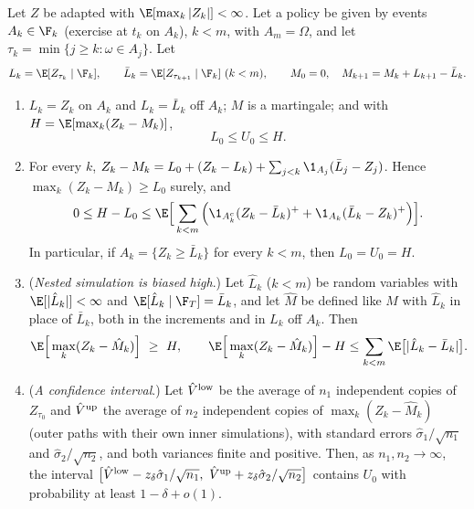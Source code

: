 \begin{proposition}\label{prop:am-andersen-broadie}
Let $Z$ be adapted with $\E[\max_k|Z_k|]<\infty$. Let a policy be given by events
$A_k\in\F_k$ (exercise at $t_k$ on $A_k$), $k<m$, with $A_m=\Omega$, and let
$\tau_k=\min\{j\ge k:\omega\in A_j\}$. Let
\[
  L_k=\E[Z_{\tau_k}\mid\F_k],\qquad\bar L_k=\E[Z_{\tau_{k+1}}\mid\F_k]\ (k<m),\qquad
  M_0=0,\quad M_{k+1}=M_k+L_{k+1}-\bar L_k .
\]
\begin{enumerate}[label=(\roman*)]
  \item $L_k=Z_k$ on $A_k$ and $L_k=\bar L_k$ off $A_k$; $M$ is a martingale; and with
    $H=\E[\max_k(Z_k-M_k)]$,
    \[
      L_0\le U_0\le H .
    \]
  \item For every $k$, $Z_k-M_k=L_0+(Z_k-L_k)+\sum_{j<k}\1_{A_j}(\bar L_j-Z_j)$. Hence
    $\max_k(Z_k-M_k)\ge L_0$ surely, and
    \[
      0\le H-L_0\le\E\Big[\sum_{k<m}\Big(\1_{A_k^c}(Z_k-\bar L_k)^++\1_{A_k}(\bar L_k-Z_k)^+\Big)\Big].
    \]
    In particular, if $A_k=\{Z_k\ge\bar L_k\}$ for every $k<m$, then $L_0=U_0=H$.
  \item (\emph{Nested simulation is biased high}.) Let $\hat L_k$ ($k<m$) be random variables
    with $\E[|\hat L_k|]<\infty$ and $\E[\hat L_k\mid\F_T]=\bar L_k$, and let $\hat M$ be
    defined like $M$ with $\hat L_k$ in place of $\bar L_k$, both in the increments and in
    $L_k$ off $A_k$. Then
    \[
      \E\Big[\max_k(Z_k-\hat M_k)\Big]\ \ge\ H,\qquad
      \E\Big[\max_k(Z_k-\hat M_k)\Big]-H\le\sum_{k<m}\E\big[|\hat L_k-\bar L_k|\big].
    \]
  \item (\emph{A confidence interval}.) Let $\hat V^{\rm low}$ be the average of $n_1$
    independent copies of $Z_{\tau_0}$ and $\hat V^{\rm up}$ the average of $n_2$ independent
    copies of $\max_k(Z_k-\hat M_k)$ (outer paths with their own inner simulations), with
    standard errors $\hat\sigma_1/\sqrt{n_1}$ and $\hat\sigma_2/\sqrt{n_2}$, and both variances
    finite and positive. Then, as $n_1,n_2\to\infty$, the interval
    $\big[\hat V^{\rm low}-z_\delta\hat\sigma_1/\sqrt{n_1},\ \hat V^{\rm up}+z_\delta\hat\sigma_2/\sqrt{n_2}\big]$
    contains $U_0$ with probability at least $1-\delta+o(1)$.
\end{enumerate}
\end{proposition}

